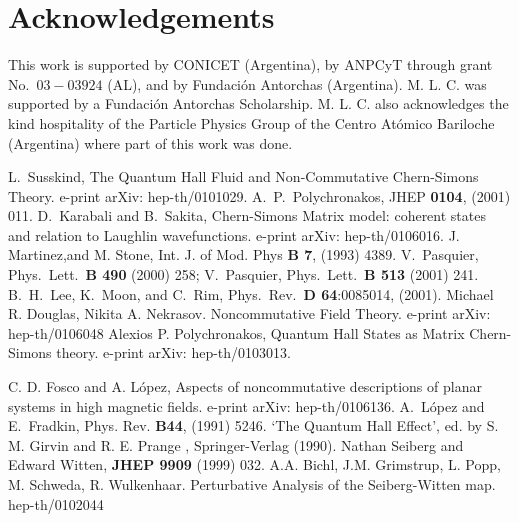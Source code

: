 \documentclass[a4paper,12pt]{article}
\begin{document}
\section{Acknowledgements}
This work is supported by CONICET (Argentina), by ANPCyT through grant
No.\ $03-03924$ (AL), and by Fundaci{\'o}n Antorchas (Argentina).
 M. L. C. 
was supported by a Fundaci{\'o}n Antorchas Scholarship. M. L. C.
also acknowledges the kind hospitality of the Particle Physics Group of the Centro
At{\'o}mico Bariloche (Argentina) where part of this work was done. 

\newpage
\begin{thebibliography}{99}
L.~Susskind, The Quantum Hall Fluid and Non-Commutative
Chern-Simons Theory. e-print arXiv: hep-th/0101029.
A.~P.~Polychronakos, JHEP {\bf 0104}, (2001) 011.
D.~Karabali and B.~Sakita, Chern-Simons Matrix model: coherent states
and relation to Laughlin wavefunctions. e-print arXiv: hep-th/0106016.
J. Martinez,and  M. Stone,  Int. J. of Mod. Phys {\bf B 7}, 
(1993) 4389.
V.~Pasquier, Phys.~Lett.~{\bf B 490} (2000) 258;
 V.~Pasquier, Phys.~Lett.~{\bf B 513} (2001) 241.
B.~H.~Lee, K.~Moon, and C.~Rim, Phys.~Rev.~{\bf D 64}:0085014, 
(2001).
 Michael R. Douglas, Nikita A. Nekrasov.
 Noncommutative Field Theory. e-print arXiv: hep-th/0106048
 Alexios P. Polychronakos, Quantum Hall States as Matrix Chern-Simons theory.
e-print arXiv: hep-th/0103013.
 
C. D. Fosco and A. L{\'o}pez, Aspects of noncommutative
descriptions of planar systems in high magnetic fields. e-print arXiv:
hep-th/0106136.
A.~L{\'o}pez and E.~Fradkin, Phys. Rev. {\bf B44}, 
(1991) 5246.
`The Quantum Hall Effect', ed. by S. M. Girvin and R. E. Prange ,
Springer-Verlag (1990).
 Nathan Seiberg and Edward Witten, {\bf JHEP 9909} (1999) 032.
 A.A. Bichl, J.M. Grimstrup, L. Popp, M. Schweda, R.
 Wulkenhaar. Perturbative Analysis of the Seiberg-Witten map. hep-th/0102044
\end{thebibliography}
\end{document}
